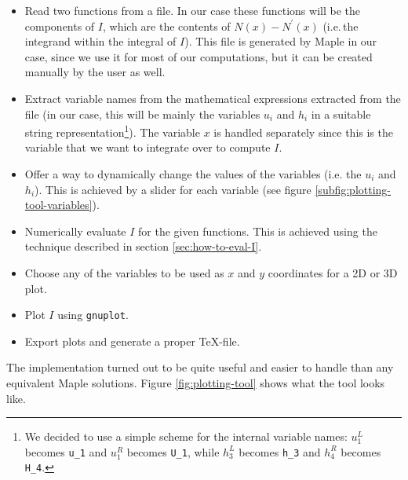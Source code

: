 \documentclass{article}
\begin{document}
\begin{itemize}
\item Read two functions from a file. In our case these functions will be the components of $I$, which are the contents of $N\left(x\right)-N^\prime\left(x\right)$ (i.e.\,the integrand within the integral of $I$). This file is generated by Maple in our case, since we use it for most of our computations, but it can be created manually by the user as well.
\item Extract variable names from the mathematical expressions extracted from the file (in our case, this will be mainly the variables $u_i$ and $h_i$ in a suitable string representation\footnote{We decided to use a simple scheme for the internal variable names: $u_1^L$ becomes \texttt{u\_1} and $u_1^R$ becomes \texttt{U\_1}, while $h_3^L$ becomes \texttt{h\_3} and $h_4^R$ becomes \texttt{H\_4}.}). The variable $x$ is handled separately since this is the variable that we want to integrate over to compute $I$.
\item Offer a way to dynamically change the values of the variables (i.e. the $u_i$ and $h_i$). This is achieved by a slider for each variable (see figure \ref{subfig:plotting-tool-variables}).
\item Numerically evaluate $I$ for the given functions. This is achieved using the technique described in section \ref{sec:how-to-eval-I}.
\item Choose any of the variables to be used as $x$ and $y$ coordinates for a 2D or 3D plot.
\item Plot $I$ using \texttt{gnuplot}.
\item Export plots and generate a proper TeX-file.
\end{itemize}

The implementation turned out to be quite useful and easier to handle than any equivalent Maple solutions. Figure \ref{fig:plotting-tool} shows what the tool looks like.
\end{document}
